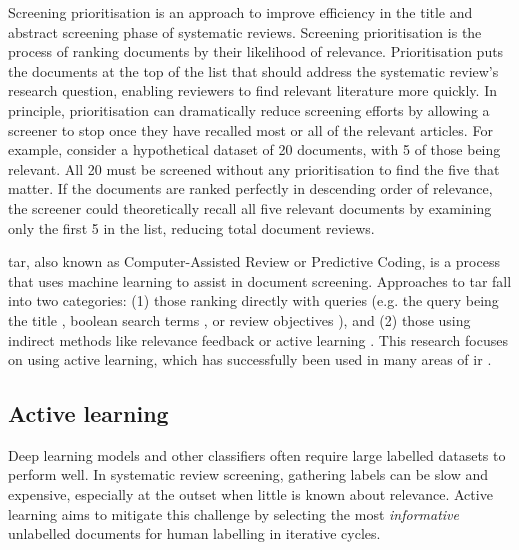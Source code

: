 \documentclass[10pt,oneside]{book}
\begin{document}
Screening prioritisation is an approach to improve efficiency in the title and abstract screening phase of systematic reviews. Screening prioritisation is the process of ranking documents by their likelihood of relevance. Prioritisation puts the documents at the top of the list that should address the systematic review's research question, enabling reviewers to find relevant literature more quickly. In principle, prioritisation can dramatically reduce screening efforts by allowing a screener to stop once they have recalled most or all of the relevant articles. For example, consider a hypothetical dataset of 20 documents, with 5 of those being relevant. All 20 must be screened without any prioritisation to find the five that matter. If the documents are ranked perfectly in descending order of relevance, the screener could theoretically recall all five relevant documents by examining only the first 5 in the list, reducing total document reviews. 

\gls*{tar}, also known as Computer-Assisted Review or Predictive Coding, is a process that uses machine learning to assist in document screening. Approaches to \gls*{tar} fall into two categories: (1) those ranking directly with queries (e.g. the query being the title \cite{alharbi_ranking_2017, alharbi_retrieving_2018}, boolean search terms  \cite{alharbi_ranking_2017, alharbi_retrieving_2018, alharbi_ranking_2019}, or review objectives \cite{ferro_qut_2017, scells_integrating_2017}), and (2) those using indirect methods like relevance feedback \cite{alharbi_ranking_2019} or active learning \cite{cormack_technology-assisted_2017, cormack_systems_2019, grossman_technology-assisted_2010, grossman_automatic_2017}. This research focuses on using active learning, which has successfully been used in many areas of \gls*{ir} \cite{cormack_autonomy_2015, cormack_engineering_2016, yu_fast2_2019, yu_finding_2018, miwa_reducing_2014}.

\subsection{Active learning}

Deep learning models and other classifiers often require large labelled datasets to perform well. In systematic review screening, gathering labels can be slow and expensive, especially at the outset when little is known about relevance. Active learning aims to mitigate this challenge by selecting the most \emph{informative} unlabelled documents for human labelling in iterative cycles.
\end{document}
